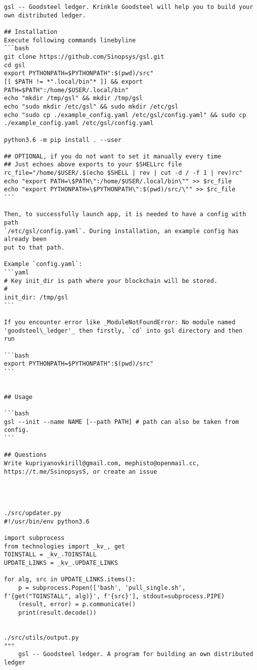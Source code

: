 \begin{lstlisting}
gsl -- Goodsteel ledger. Krinkle Goodsteel will help you to build your own distributed ledger.

## Installation
Execute following commands linebyline
```bash
git clone https://github.com/Sinopsys/gsl.git
cd gsl
export PYTHONPATH=$PYTHONPATH":$(pwd)/src"
[[ $PATH != *".local/bin"* ]] && export PATH=$PATH":/home/$USER/.local/bin"
echo "mkdir /tmp/gsl" && mkdir /tmp/gsl
echo "sudo mkdir /etc/gsl" && sudo mkdir /etc/gsl
echo "sudo cp ./example_config.yaml /etc/gsl/config.yaml" && sudo cp ./example_config.yaml /etc/gsl/config.yaml

python3.6 -m pip install . --user

## OPTIONAL, if you do not want to set it manually every time
## Just echoes above exports to your $SHELLrc file
rc_file="/home/$USER/.$(echo $SHELL | rev | cut -d / -f 1 | rev)rc"
echo "export PATH=\$PATH\":/home/$USER/.local/bin\"" >> $rc_file
echo "export PYTHONPATH=\$PYTHONPATH\":$(pwd)/src/\"" >> $rc_file
```

Then, to successfully launch app, it is needed to have a config with path
`/etc/gsl/config.yaml`. During installation, an example config has already been
put to that path.

Example `config.yaml`:
```yaml
# Key init_dir is path where your blockchain will be stored.
#
init_dir: /tmp/gsl
```

If you encounter error like _ModuleNotFoundError: No module named 'goodsteel\_ledger'_ then firstly, `cd` into gsl directory and then run

```bash
export PYTHONPATH=$PYTHONPATH":$(pwd)/src"
```


## Usage

```bash
gsl --init --name NAME [--path PATH] # path can also be taken from config.
```

## Questions
Write kupriyanovkirill@gmail.com, mephisto@openmail.cc, https://t.me/SsinopsysS, or create an issue




./src/updater.py
#!/usr/bin/env python3.6

import subprocess
from technologies import _kv_, get
TOINSTALL = _kv_.TOINSTALL
UPDATE_LINKS = _kv_.UPDATE_LINKS

for alg, src in UPDATE_LINKS.items():
    p = subprocess.Popen(['bash', 'pull_single.sh', f'{get("TOINSTALL", alg)}', f'{src}'], stdout=subprocess.PIPE)
    (result, error) = p.communicate()
    print(result.decode())


./src/utils/output.py
"""
    gsl -- Goodsteel ledger. A program for building an own distributed ledger


\end{lstlisting}
